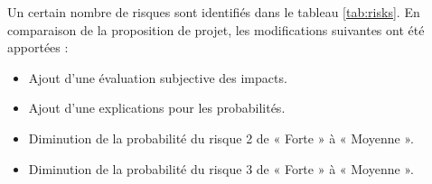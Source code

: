 \documentclass[a4paper, oneside, 12pt, titlepage]{article}
\begin{document}
%
%

Un certain nombre de risques sont identifiés dans le tableau \ref{tab:risks}. En comparaison de la
proposition de projet, les modifications suivantes ont été apportées :

\begin{itemize}
  \item Ajout d'une évaluation subjective des impacts.
  \item Ajout d'une explications pour les probabilités.
  \item Diminution de la probabilité du risque 2 de « Forte » à « Moyenne ».
  \item Diminution de la probabilité du risque 3 de « Forte » à « Moyenne ».
\end{itemize}
\end{document}
